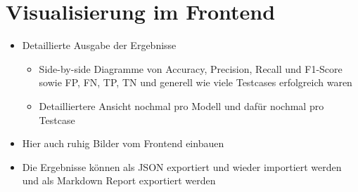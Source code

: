 \section{Visualisierung im Frontend}\label{sec:visualisierung-im-frontend}

\begin{itemize}
    \item Detaillierte Ausgabe der Ergebnisse
    \begin{itemize}
        \item Side-by-side Diagramme von Accuracy, Precision, Recall und F1-Score sowie FP, FN, TP, TN und generell wie viele Testcases erfolgreich waren
        \item Detailliertere Ansicht nochmal pro Modell und dafür nochmal pro Testcase
    \end{itemize}
    \item Hier auch ruhig Bilder vom Frontend einbauen
    \item Die Ergebnisse können als JSON exportiert und wieder importiert werden und als Markdown Report exportiert werden
\end{itemize}
